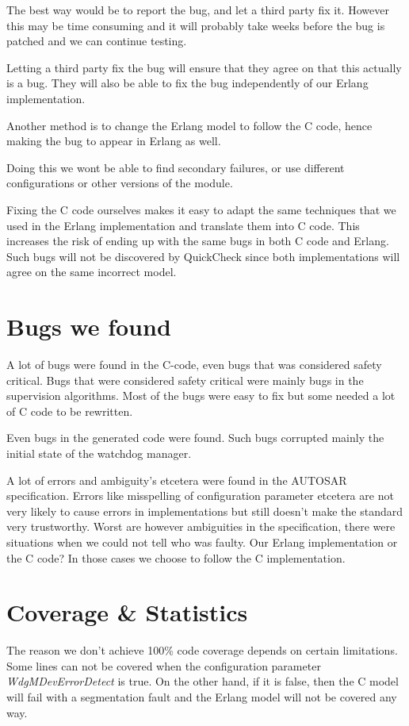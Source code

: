 \documentclass[a4paper]{article}
\begin{document}
The best way would be to report the bug, and let a third party fix
it. However this may be time consuming and it will probably take weeks
before the bug is patched and we can continue testing.

Letting a third party fix the bug will ensure that they agree on that
this actually is a bug. They will also be able to fix the bug
independently of our Erlang implementation.

Another method is to change the Erlang model to follow the C code,
hence making the bug to appear in Erlang as well.

Doing this we wont be able to find secondary failures, or use
different configurations or other versions of the module.

Fixing the C code ourselves makes it easy to adapt the same techniques
that we used in the Erlang implementation and translate them into C
code.
This increases the risk of ending up with the same bugs in both C code
and Erlang. Such bugs will not be discovered by QuickCheck since both
implementations will agree on the same incorrect model.

\section{Bugs we found}
A lot of bugs were found in the C-code, even bugs that was considered safety
critical.  Bugs that were considered safety critical were mainly bugs in the
supervision algorithms.  Most of the bugs were easy to fix but some needed a
lot of C code to be rewritten.

Even bugs in the generated code were found. Such bugs corrupted mainly the
initial state of the watchdog manager.

A lot of errors and ambiguity's etcetera were found in the AUTOSAR
specification. Errors like misspelling of configuration parameter etcetera are
not very likely to cause errors in implementations but still doesn't make the
standard very trustworthy. Worst are however ambiguities in the specification,
there were situations when we could not tell who was faulty. Our Erlang
implementation or the C code? In those cases we choose to follow the C
implementation.

\section{Coverage \& Statistics}
The reason we don't achieve 100\% code coverage depends on certain limitations.
Some lines can not be covered when the configuration parameter
\emph{WdgMDevErrorDetect} is true. On the other hand, if it is
false, then the C model will fail with a segmentation fault and the
Erlang model will not be covered any way.
\end{document}
